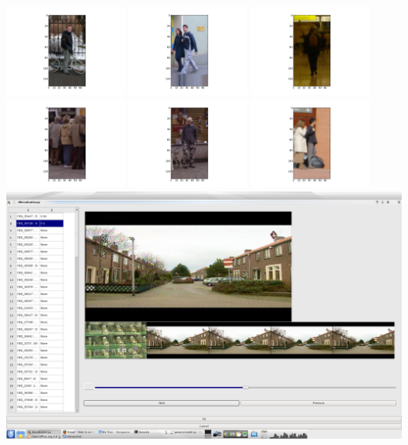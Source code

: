 \documentclass{report}
\begin{document}
\clearpage%
\includegraphics[width=4cm]{dbshow-0-4.png}
\clearpage%
\includegraphics[width=4cm]{dbshow-0-5.png}
\clearpage%
\includegraphics[width=4cm]{dbshow-0-6.png}
\clearpage%
\includegraphics[width=4cm]{dbshow-0-7.png}
\clearpage%
\includegraphics[width=4cm]{dbshow-0-8.png}
\clearpage%
\includegraphics[width=4cm]{dbshow-0-9.png}
\clearpage%
\includegraphics[width=\textwidth]{dbeval.png}
\end{document}
